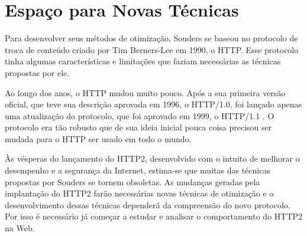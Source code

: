 \section{Espaço para Novas Técnicas}
Para desenvolver seus métodos de otimização, Souders se baseou no protocolo de troca de conteúdo criado por Tim Berners-Lee em 1990, o HTTP. Esse protocolo tinha algumas características e limitações que faziam necessárias as técnicas propostas por ele.

Ao longo dos anos, o HTTP mudou muito pouco. Após a sua primeira versão oficial, que teve sua descrição aprovada em 1996, o HTTP/1.0, foi lançado apenas uma atualização do protocolo, que foi aprovado em 1999, o HTTP/1.1 \cite{W3Http}. O protocolo era tão robusto que de sua ideia inicial pouca coisa precisou ser mudada para o HTTP ser usado em todo o mundo.

Às vésperas do lançamento do HTTP2, desenvolvido com o intuito de melhorar o desempenho e a segurança da Internet, estima-se que muitas das técnicas propostas por Souders se tornem obsoletas. As mudanças geradas pela implantação do HTTP2 farão necessárias novas técnicas de otimização e o desenvolvimento dessas técnicas dependerá da compreensão do novo protocolo. Por isso é necessário já começar a estudar e analisar o comportamento do HTTP2 na Web.



